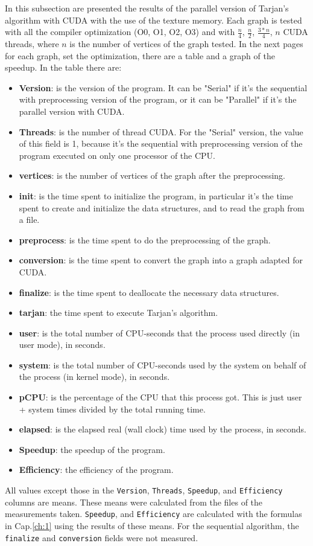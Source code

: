 In this subsection are presented the results of the parallel version of Tarjan's algorithm with CUDA with the use of the texture memory.
Each graph is tested with all the compiler optimization (O0, O1, O2, O3) and with $\frac{n}{4}$, $\frac{n}{2}$, $\frac{3*n}{4}$, $n$ CUDA threads, where $n$ is the number of vertices of the graph tested.  
In the next pages for each graph, set the optimization, there are a table and a graph of the speedup.
In the table there are:
\begin{itemize}
    \item \textbf{Version}: is the version of the program. It can be "Serial" if it's the sequential with preprocessing version of the program, or it can be "Parallel" if it's the parallel version with CUDA.
    \item \textbf{Threads}: is the number of thread CUDA. For the "Serial" version, the value of this field is 1, because it's the sequential with preprocessing version of the program executed on only one processor of the CPU.
    \item \textbf{vertices}: is the number of vertices of the graph after the preprocessing.
    \item \textbf{init}: is the time spent to initialize the program, in particular it's the time spent to create and initialize the data structures, and to read the graph from a file.
    \item \textbf{preprocess}: is the time spent to do the preprocessing of the graph.
    \item \textbf{conversion}: is the time spent to convert the graph into a graph adapted for CUDA.
    \item \textbf{finalize}: is the time spent to deallocate the necessary data structures.
    \item \textbf{tarjan}: the time spent to execute Tarjan's algorithm.
    \item \textbf{user}: is the total number of CPU-seconds that the process used directly (in user mode), in seconds.
    \item \textbf{system}: is the total number of CPU-seconds used by the system on behalf of the process (in kernel mode), in seconds.
    \item \textbf{pCPU}: is the percentage of the CPU that this process got. This is just user + system times divided by the total running time.
    \item \textbf{elapsed}: is the elapsed real (wall clock) time used by the process, in seconds.
    \item \textbf{Speedup}: the speedup of the program.
    \item \textbf{Efficiency}: the efficiency of the program.
\end{itemize}
All values except those in the \verb|Version|, \verb|Threads|, \verb|Speedup|, and \verb|Efficiency| columns are means. These means were calculated from the files of the measurements taken.
\verb|Speedup|, and \verb|Efficiency| are calculated with the formulas in Cap.\ref{ch:1} using the results of these means.
For the sequential algorithm, the \verb|finalize| and \verb|conversion| fields were not measured. 


